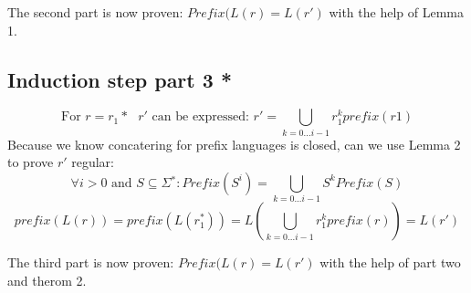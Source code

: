 \documentclass{article}
\begin{document}
    The second part is now proven: $ Prefix(L(r)=L(r') $ with the help of Lemma 1.


\subsection*{Induction step part 3 *}
        $$ \text{For } r=r_{1}* \text{ } r' \text{ can be expressed: } r'= {\bigcup} _{k=0...i-1} r^k_1 prefix(r1) $$
    Because we know concatering for prefix languages is closed, can we use Lemma 2 to prove $ r{'} $ regular:
        $$ \forall i>0 \text{ and } S \subseteq \Sigma{^*}: Prefix(S^i)= {\bigcup}_{k=0...i-1} S^k Prefix(S) $$
        $$ prefix(L(r)) = prefix(L(r^*_1)) = L \left( {\bigcup} _{k=0...i-1}r^k_1 prefix(r)\right) = L(r') $$

The third part is now proven: $ Prefix(L(r)=L(r') $ with the help of part two and therom 2.
\end{document}
